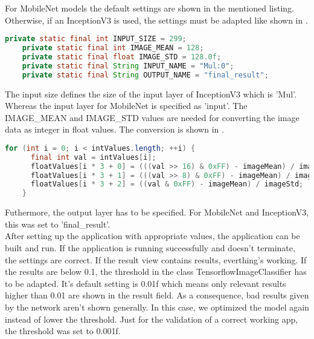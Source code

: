 For MobileNet models the default settings are shown in the mentioned listing. Otherwise, if an InceptionV3 is used, the settings must be adapted like shown in .

\begin{lstlisting}[caption=Setup for InceptionV3, label=list:include_inception, language=java]
    private static final int INPUT_SIZE = 299;
    private static final int IMAGE_MEAN = 128;
    private static final float IMAGE_STD = 128.0f;
    private static final String INPUT_NAME = "Mul:0";
    private static final String OUTPUT_NAME = "final_result";
\end{lstlisting}

The input size defines the size of the input layer of InceptionV3 which is 'Mul'. Whereas the input layer for MobileNet is specified as 'input'. The IMAGE_MEAN and IMAGE_STD values are needed for converting the image data as integer in float values. The conversion is shown in .

\begin{lstlisting}[caption=Conversion of image data integer to float, label=list:int_conversion, language=java]
	for (int i = 0; i < intValues.length; ++i) {
      final int val = intValues[i];
      floatValues[i * 3 + 0] = (((val >> 16) & 0xFF) - imageMean) / imageStd;
      floatValues[i * 3 + 1] = (((val >> 8) & 0xFF) - imageMean) / imageStd;
      floatValues[i * 3 + 2] = ((val & 0xFF) - imageMean) / imageStd;
    }
\end{lstlisting}

Futhermore, the output layer has to be specified. For MobileNet and InceptionV3, this was set to 'final_result'. \\

After setting up the application with appropriate values, the application can be built and run. If the application is running successfully and doesn't terminate, the settings are correct. If the result view contains results, everthing's working. If the results are below 0.1, the threshold in the class TensorflowImageClassifier has to be adapted. It's default setting is 0.01f which means only relevant results higher than 0.01 are shown in the result field. As a consequence, bad results given by the network aren't shown generally. In this case, we optimized the model again instead of lower the threshold. Just for the validation of a correct working app, the threshold was set to 0.001f.